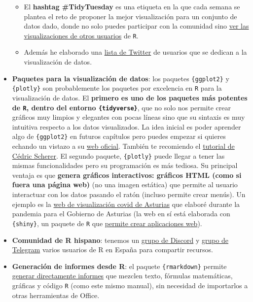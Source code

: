\documentclass[11pt,]{book}
\providecommand{\tightlist}{%
  \setlength{\itemsep}{0pt}\setlength{\parskip}{0pt}}
\begin{document}
\begin{itemize}
  \begin{itemize}
  \tightlist
  \item
    El \textbf{hashtag \#TidyTuesday} es una etiqueta en la que cada semana se plantea el reto de proponer la mejor visualización para un conjunto de datos dado, donde no solo puedes participar con la comunidad sino \href{https://github.com/rfordatascience/tidytuesday}{ver las visualizaciones de otros usuarios} de \texttt{R}.
  \item
    Además he elaborado una \href{https://twitter.com/i/lists/1324478481338683392?s=20}{lista de Twitter} de usuarios que se dedican a la visualización de datos.
  \end{itemize}
\item
  \textbf{Paquetes para la visualización de datos}: los paquetes \texttt{\{ggplot2\}} y \texttt{\{plotly\}} son probablemente los paquetes por excelencia en \texttt{R} para la visualización de datos. El \textbf{primero es uno de los paquetes más potentes de \texttt{R}, dentro del entorno \texttt{\{tidyverse\}}}, que no solo nos permite crear gráficos muy limpios y elegantes con pocas líneas sino que su sintaxis es muy intuitiva respecto a los datos visualizados. La idea inicial es poder aprender algo de \texttt{\{ggplot2\}} en futuros capítulos pero puedes empezar si quieres echando un vistazo a su \href{https://ggplot2.tidyverse.org/}{web oficial}. También te recomiendo el \href{https://www.cedricscherer.com/2019/08/05/a-ggplot2-tutorial-for-beautiful-plotting-in-r/}{tutorial de Cédric Scherer}. El segundo paquete, \texttt{\{plotly\}} puede llegar a tener las mismas funcionalidades pero su programación es más tediosa. Su principal ventaja es que \textbf{genera gráficos interactivos: gráficos HTML (como si fuera una página web)} (no una imagen estática) que permite al usuario interactuar con los datos pasando el ratón (incluso permite crear menús). Un ejemplo es la \href{https://dgspasturias.shinyapps.io/panel_de_indicadores_asturias/}{web de visualización covid de Asturias} que elaboré durante la pandemia para el Gobierno de Asturias (la web en sí está elaborada con \texttt{\{shiny\}}, un paquete de \texttt{R} que \href{https://shiny.rstudio.com/tutorial/}{permite crear aplicaciones web}).
\item
  \textbf{Comunidad de R hispano}: tenemos un \href{https://discord.gg/7ueKQqeaGr}{grupo de Discord} y \href{https://t.me/hispanoverse}{grupo de Telegram} varios usuarios de R en España para compartir recursos.
\item
  \textbf{Generación de informes desde R}: el paquete \texttt{\{rmarkdown\}} permite \href{https://rmarkdown.rstudio.com/}{generar directamente informes} que mezclen texto, fórmulas matemáticas, gráficas y código \texttt{R} (como este mismo manual), sin necesidad de importarlos a otras herramientas de Office.
\end{itemize}


\end{document}

